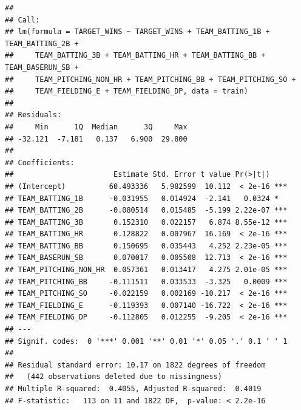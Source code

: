\documentclass[]{article}
\begin{document}
\begin{verbatim}
## 
## Call:
## lm(formula = TARGET_WINS ~ TARGET_WINS + TEAM_BATTING_1B + TEAM_BATTING_2B + 
##     TEAM_BATTING_3B + TEAM_BATTING_HR + TEAM_BATTING_BB + TEAM_BASERUN_SB + 
##     TEAM_PITCHING_NON_HR + TEAM_PITCHING_BB + TEAM_PITCHING_SO + 
##     TEAM_FIELDING_E + TEAM_FIELDING_DP, data = train)
## 
## Residuals:
##     Min      1Q  Median      3Q     Max 
## -32.121  -7.181   0.137   6.900  29.800 
## 
## Coefficients:
##                       Estimate Std. Error t value Pr(>|t|)    
## (Intercept)          60.493336   5.982599  10.112  < 2e-16 ***
## TEAM_BATTING_1B      -0.031955   0.014924  -2.141   0.0324 *  
## TEAM_BATTING_2B      -0.080514   0.015485  -5.199 2.22e-07 ***
## TEAM_BATTING_3B       0.152310   0.022157   6.874 8.55e-12 ***
## TEAM_BATTING_HR       0.128822   0.007967  16.169  < 2e-16 ***
## TEAM_BATTING_BB       0.150695   0.035443   4.252 2.23e-05 ***
## TEAM_BASERUN_SB       0.070017   0.005508  12.713  < 2e-16 ***
## TEAM_PITCHING_NON_HR  0.057361   0.013417   4.275 2.01e-05 ***
## TEAM_PITCHING_BB     -0.111511   0.033533  -3.325   0.0009 ***
## TEAM_PITCHING_SO     -0.022159   0.002169 -10.217  < 2e-16 ***
## TEAM_FIELDING_E      -0.119393   0.007140 -16.722  < 2e-16 ***
## TEAM_FIELDING_DP     -0.112805   0.012255  -9.205  < 2e-16 ***
## ---
## Signif. codes:  0 '***' 0.001 '**' 0.01 '*' 0.05 '.' 0.1 ' ' 1
## 
## Residual standard error: 10.17 on 1822 degrees of freedom
##   (442 observations deleted due to missingness)
## Multiple R-squared:  0.4055, Adjusted R-squared:  0.4019 
## F-statistic:   113 on 11 and 1822 DF,  p-value: < 2.2e-16
\end{verbatim}
\end{document}
